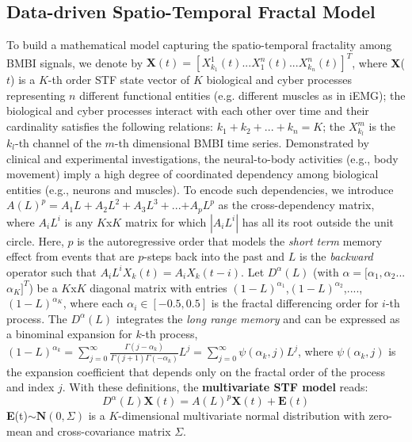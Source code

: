 \subsection{Data-driven Spatio-Temporal Fractal Model}
To build a mathematical model capturing the spatio-temporal fractality among BMBI signals, we denote by $\textbf{X}(t) = [ X_{k_{1}}^{1}(t) ... X_{1}^{n}(t) ... X_{k_{n}}^{n}(t) ]^{T}$,
where \textbf{X}($t$) is a $K$-th order STF state vector of $K$ biological and cyber processes representing $n$ different functional entities (e.g. different muscles as in iEMG); the biological and cyber processes interact with each other over time and their cardinality satisfies the following relations: $k_1+k_2+...+k_n=K$; the $X_{k_{l}}^{m}$ is the $k_{l}$-th channel of the $m$-th dimensional BMBI time series. Demonstrated by clinical and experimental investigations, the neural-to-body activities (e.g., body movement) imply a high degree of coordinated dependency among biological entities (e.g., neurons and muscles). To encode such dependencies, we introduce $A(L)^{p}=A_1L+A_2L^2+A_3L^3+$...$+A_pL^p$ as the cross-dependency matrix, where $A_iL^i$ is any $K$x$K$ matrix for which $|A_iL^i|$ has all its root outside the unit circle. Here, $p$ is the autoregressive order that models the \textit{short term} memory effect from events that are $p$-steps back into the past and $L$ is the \textit{backward} operator such that $A_iL^iX_k(t)=A_iX_k(t-i)$. Let $D^{\alpha}(L)$ (with $\alpha=[\alpha_{1},\alpha_{2}$...$\alpha_{K}]^{T}$) be a $K$x$K$ diagonal matrix with entries $(1-L)^{\alpha_{1}}$,$(1-L)^{\alpha_{2}}$,....,$(1-L)^{\alpha_{K}}$, where each $\alpha_{i}\in [-0.5,0.5]$ is the fractal differencing order for $i$-th process. The $D^{\alpha}(L)$ integrates the \textit{long range memory} and can be expressed as a binominal expansion for $k$-th process, $(1-L)^{\alpha_{k}}=\sum_{j=0}^{\infty}\frac{\Gamma(j-\alpha_{k})}{\Gamma(j+1)\Gamma(-\alpha_{k})}L^{j}=\sum_{j=0}^{\infty}\psi(\alpha_{k},j)L^{j}$, where $\psi(\alpha_{k},j)$ is the expansion coefficient that depends only on the fractal order of the process and index $j$. With these definitions, the \textbf{multivariate STF model} reads:
\begin{equation}\label{eq:backward}
D^{\alpha}(L)\textbf{X}(t)=A(L)^p\textbf{X}(t)+\textbf{E}(t)
\end{equation}
\vskip -2mm
\textbf{E}(t)$\sim \textbf{N}(0,\Sigma)$ is a $K$-dimensional multivariate normal distribution with zero-mean and cross-covariance matrix $\Sigma$.
